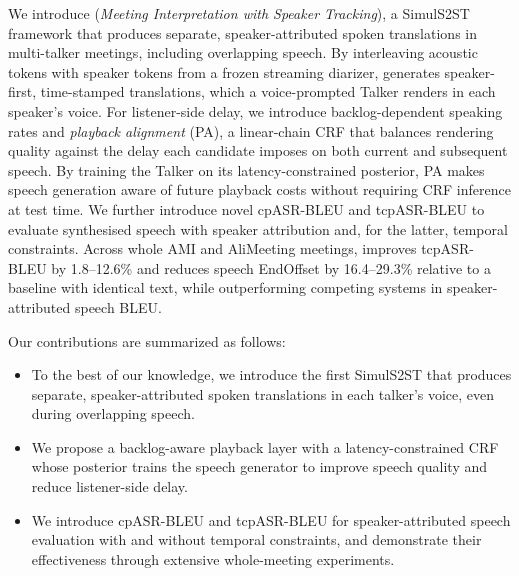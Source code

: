 We introduce \sys{} (\emph{Meeting Interpretation with Speaker Tracking}), a SimulS2ST framework that produces separate, speaker-attributed spoken translations in multi-talker meetings, including overlapping speech. By interleaving acoustic tokens with speaker tokens from a frozen streaming diarizer, \sys{} generates speaker-first, time-stamped translations, which a voice-prompted Talker renders in each speaker's voice. For listener-side delay, we introduce backlog-dependent speaking rates and \emph{playback alignment} (PA), a linear-chain CRF that balances rendering quality against the delay each candidate imposes on both current and subsequent speech. By training the Talker on its latency-constrained posterior, PA makes speech generation aware of future playback costs without requiring CRF inference at test time. We further introduce novel cpASR-BLEU and tcpASR-BLEU to evaluate synthesised speech with speaker attribution and, for the latter, temporal constraints. Across whole AMI and AliMeeting meetings, \sys{} improves tcpASR-BLEU by 1.8--12.6\% and reduces speech EndOffset by 16.4--29.3\% relative to a baseline with identical text, while outperforming competing systems in speaker-attributed speech BLEU.

Our contributions are summarized as follows:
\begin{itemize}
    \item To the best of our knowledge, we introduce the first SimulS2ST that produces separate, speaker-attributed spoken translations in each talker's voice, even during overlapping speech.
    \item We propose a backlog-aware playback layer with a latency-constrained CRF whose posterior trains the speech generator to improve speech quality and reduce listener-side delay.
    \item We introduce cpASR-BLEU and tcpASR-BLEU for speaker-attributed speech evaluation with and without temporal constraints, and demonstrate their effectiveness through extensive whole-meeting experiments.
\end{itemize}

